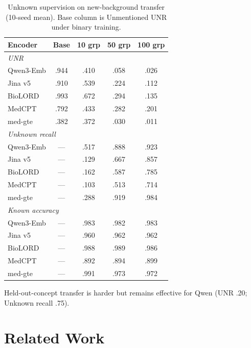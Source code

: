 \documentclass[11pt]{article}
\begin{document}
\begin{table}[t]
  \centering
  \scriptsize
  \setlength{\tabcolsep}{2pt}
  \renewcommand{\arraystretch}{1.05}
  \caption{Unknown supervision on new-background transfer (10-seed mean).
  Base column is Unmentioned UNR under binary training.}
  \label{tab:mitigation}
  \begin{tabular*}{\columnwidth}{@{\extracolsep{\fill}}lcccc@{}}
    \toprule
    \textbf{Encoder} & \textbf{Base} &
    \textbf{10 grp} & \textbf{50 grp} & \textbf{100 grp} \\
    \midrule
    \multicolumn{5}{l}{\emph{UNR}} \\
    Qwen3-Emb & .944 & .410 & .058 & .026 \\
    Jina v5   & .910 & .539 & .224 & .112 \\
    BioLORD   & .993 & .672 & .294 & .135 \\
    MedCPT    & .792 & .433 & .282 & .201 \\
    med-gte   & .382 & .372 & .030 & .011 \\
    \midrule
    \multicolumn{5}{l}{\emph{Unknown recall}} \\
    Qwen3-Emb & --- & .517 & .888 & .923 \\
    Jina v5   & --- & .129 & .667 & .857 \\
    BioLORD   & --- & .162 & .587 & .785 \\
    MedCPT    & --- & .103 & .513 & .714 \\
    med-gte   & --- & .288 & .919 & .984 \\
    \midrule
    \multicolumn{5}{l}{\emph{Known accuracy}} \\
    Qwen3-Emb & --- & .983 & .982 & .983 \\
    Jina v5   & --- & .960 & .962 & .962 \\
    BioLORD   & --- & .988 & .989 & .986 \\
    MedCPT    & --- & .892 & .894 & .899 \\
    med-gte   & --- & .991 & .973 & .972 \\
    \bottomrule
  \end{tabular*}
\end{table}


Held-out-concept transfer is harder but remains effective for Qwen
(UNR .20; Unknown recall .75).

\section{Related Work}
\end{document}
